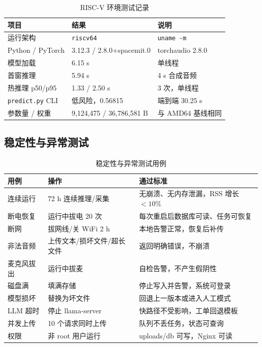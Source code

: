 \documentclass[UTF8,11pt,a4paper,fontset=none]{ctexart}
\begin{document}
\begin{table}[htbp]
\centering
\small
\caption{RISC-V 环境测试记录}
\label{tab:results}
\begin{tabular}{p{3.6cm}p{5.2cm}p{6.0cm}}
\toprule
项目 & 结果 & 说明 \\
\midrule
运行架构 & \texttt{riscv64} & \texttt{uname -m} \\
Python / PyTorch & 3.12.3 / 2.8.0+spacemit.0 & torchaudio 2.8.0 \\
模型加载 & 6.15 s & 单线程 \\
首窗推理 & 5.94 s & 4 s 合成音频 \\
热推理 p50/p95 & 1.33 / 2.50 s & 3 次，单线程 \\
\texttt{predict.py} CLI & 低风险，0.56815 & 端到端 30.25 s \\
参数量 / 权重 & 9,124,475 / 36,786,581 B & 与 AMD64 基线相同 \\
\bottomrule
\end{tabular}
\end{table}

\subsection{稳定性与异常测试}

\begin{table}[H]
\centering
\small
\caption{稳定性与异常测试用例}
\label{tab:stability}
\begin{tabular}{p{3.2cm}p{5.6cm}p{5.6cm}}
\toprule
用例 & 操作 & 通过标准 \\
\midrule
连续运行 & 72 h 连续推理/采集 & 无崩溃、无内存泄漏，RSS 增长 \(<10\%\) \\
断电恢复 & 运行中拔电 20 次 & 每次重启后数据库可读、任务可恢复 \\
断网 & 拔网线/关 WiFi 2 h & 本地告警正常，恢复后补传 \\
非法音频 & 上传文本/损坏文件/超长文件 & 返回明确错误，不崩溃 \\
麦克风拔出 & 运行中拔麦 & 自检告警，不产生假阴性 \\
磁盘满 & 填满存储 & 停止写入并告警，系统可登录 \\
模型损坏 & 替换为坏文件 & 回退上一版本或进入人工模式 \\
LLM 超时 & 停止 llama-server & 快路径不受影响，工单回退模板 \\
并发上传 & 10 个请求同时上传 & 队列不丢任务，状态可查询 \\
权限 & 非 root 用户运行 & uploads/db 可写，Nginx 可读 \\
\bottomrule
\end{tabular}
\end{table}
\end{document}
